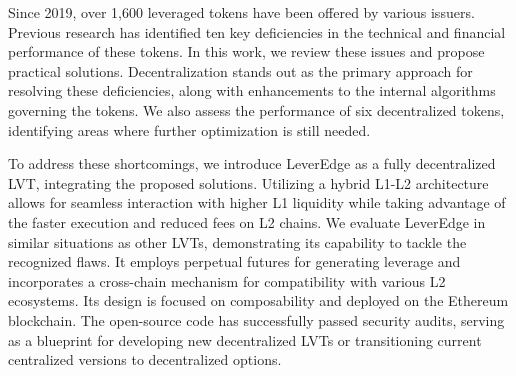 Since 2019, over 1,600 leveraged tokens have been offered by various issuers. Previous research has identified ten key deficiencies in the technical and financial performance of these tokens. In this work, we review these issues and propose practical solutions. Decentralization stands out as the primary approach for resolving these deficiencies, along with enhancements to the internal algorithms governing the tokens. We also assess the performance of six decentralized tokens, identifying areas where further optimization is still needed.

To address these shortcomings, we introduce LeverEdge as a fully decentralized LVT, integrating the proposed solutions. Utilizing a hybrid L1-L2 architecture allows for seamless interaction with higher L1 liquidity while taking advantage of the faster execution and reduced fees on L2 chains. We evaluate LeverEdge in similar situations as other LVTs, demonstrating its capability to tackle the recognized flaws. It employs perpetual futures for generating leverage and incorporates a cross-chain mechanism for compatibility with various L2 ecosystems. Its design is focused on composability and deployed on the Ethereum blockchain. The open-source code has successfully passed security audits, serving as a blueprint for developing new decentralized LVTs or transitioning current centralized versions to decentralized options.